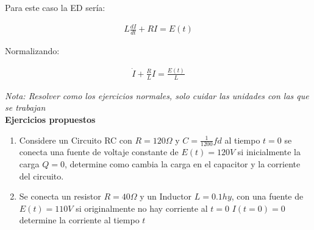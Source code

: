 Para este caso la ED sería:

\begin{equation*}
    \begin{gathered}
        L\frac{dI}{dt}+RI=E(t)
    \end{gathered}
\end{equation*}

Normalizando:

\begin{equation*}
    \begin{gathered}
        \dot{I}+\frac{R}{L}I=\frac{E(t)}{L}
    \end{gathered}
\end{equation*}

\textit{Nota: Resolver como los ejercicios normales, solo cuidar las unidades con las que se trabajan}\\

\textbf{Ejercicios propuestos}

\begin{enumerate}
  \item Considere un Circuito RC con \(\displaystyle R=120\Omega\) y \(\displaystyle C=\frac{1}{1200}fd\) al tiempo \(\displaystyle t=0\) se conecta una fuente de voltaje constante de \(\displaystyle E(t)=120V\) si inicialmente la carga \(\displaystyle Q=0\), determine como cambia la carga en el capacitor y la corriente del circuito.
  \item Se conecta un resistor \(\displaystyle R=40\Omega\) y un Inductor \(\displaystyle L=0.1hy\), con una fuente de \(\displaystyle E(t)=110V\) si originalmente no hay corriente al \(\displaystyle t=0\) \(\displaystyle I(t=0)=0\) determine la corriente al tiempo \(\displaystyle t\)
\end{enumerate}